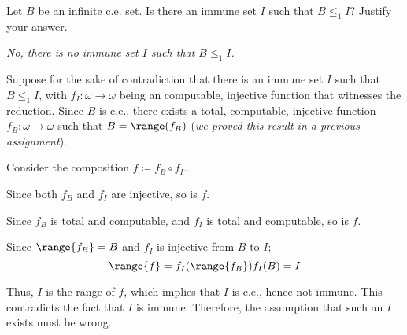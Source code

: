 \begin{problem}
  Let $B$ be an infinite c.e. set.
  Is there an immune set $I$ such that $B \leq_1 I$?
  Justify your answer.

  \begin{answer}
    \emph{No, there is no immune set $I$ such that $B \leq_1 I$.}

    Suppose for the sake of contradiction that there is an immune set
    $I$ such that $B \leq_1 I$,
    with $f_I : \omega \to \omega$ being an computable, injective function that
    witnesses the reduction.
    Since $B$ is c.e., there exists a total, computable, injective function
    $f_B : \omega \to \omega$ such that $B = \range(f_B)$
    (\emph{we proved this result in a previous assignment}).

    Consider the composition $f \coloneq f_B \circ f_I$.
    \begin{enumarabic}
      \item Since both $f_B$ and $f_I$ are injective, so is $f$.
      \item Since $f_B$ is total and computable, and $f_I$ is total and computable,
        so is $f$.
      \item Since $\range{f_B} = B$ and $f_I$ is injective
        from $B$ to $I$;
        \[ \range{f} = f_I(\range{f_B}) f_I(B) = I \]
    \end{enumarabic}

    Thus, $I$ is the range of $f$, which implies that $I$ is c.e., hence not immune.
    This contradicts the fact that $I$ is immune.
    Therefore, the assumption that such an $I$ exists must be wrong.

    \step
  \end{answer}
\end{problem}
